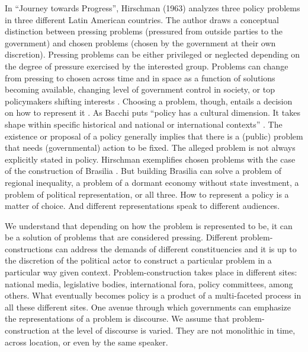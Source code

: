 \documentclass[]{interact}
\theoremstyle{plain}%
\theoremstyle{definition}
\theoremstyle{remark}
\begin{document}
In ``Journey towards Progress'', Hirschman (1963) analyzes three policy
problems in three different Latin American countries. The author draws a
conceptual distinction between pressing problems (pressured from outside
parties to the government) and chosen problems (chosen by the government
at their own discretion). Pressing problems can be either privileged or
neglected depending on the degree of pressure exercised by the
interested group. Problems can change from pressing to chosen across
time and in space as a function of solutions becoming available,
changing level of government control in society, or top policymakers
shifting interests \citep[pp.388-91]{hirschman1963}. Choosing a problem,
though, entails a decision on how to represent it \citep{bacchi2009}. As
Bacchi puts ``policy has a cultural dimension. It takes shape within
specific historical and national or international contexts''
\citeyearpar[pp.10]{bacchi2009}. The existence or proposal of a policy
generally implies that there is a (public) problem that needs
(governmental) action to be fixed. The alleged problem is not always
explicitly stated in policy. Hirschman exemplifies chosen problems with
the case of the construction of Brasilia
\citeyearpar[pp.388]{hirschman1975}. But building Brasilia can solve a
problem of regional inequality, a problem of a dormant economy without
state investment, a problem of political representation, or all three.
How to represent a policy is a matter of choice. And different
representations speak to different audiences.

We understand that depending on how the problem is represented to be, it
can be a solution of problems that are considered pressing. Different
problem-constructions can address the demands of different
constituencies and it is up to the discretion of the political actor to
construct a particular problem in a particular way given context.
Problem-construction takes place in different sites: national media,
legislative bodies, international fora, policy committees, among others.
What eventually becomes policy is a product of a multi-faceted process
in all these different sites. One avenue through which governments can
emphasize the representations of a problem is discourse. We assume that
problem-construction at the level of discourse is varied. They are not
monolithic in time, across location, or even by the same speaker.
\end{document}
